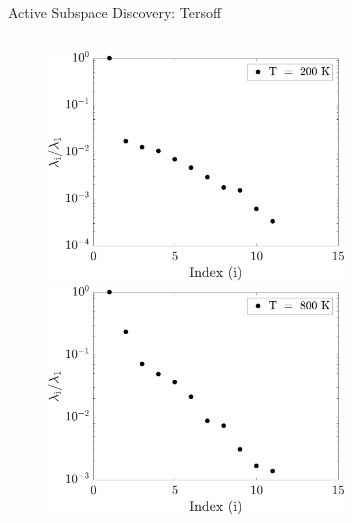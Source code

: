 \documentclass[handout,xcolor={x11names,table},compress,svgnames,mathserif]{beamer}
\renewcommand{\(}{\begin{columns}}
\renewcommand{\)}{\end{columns}}
\newcommand{\<}[1]{\begin{column}{#1}}
\renewcommand{\>}{\end{column}}
\begin{document}

\begin{frame}{Active Subspace Discovery: Tersoff}

\begin{columns}
\begin{column}{0.5\textwidth}
%
\begin{figure}[htbp]
\begin{center}
\includegraphics[width=0.8\textwidth]{./Figures/eig_tersoff_k200}
\\
\includegraphics[width=0.8\textwidth]{./Figures/eig_tersoff_k800}
\end{center}
\end{figure}
%
\end{column}
\hspace{-12mm}
\begin{column}{0.5\textwidth}
%
\begin{figure}[htbp]
\begin{center}

\end{center}
\end{figure}
\end{column}
\end{columns}
\end{frame}
\end{document}
